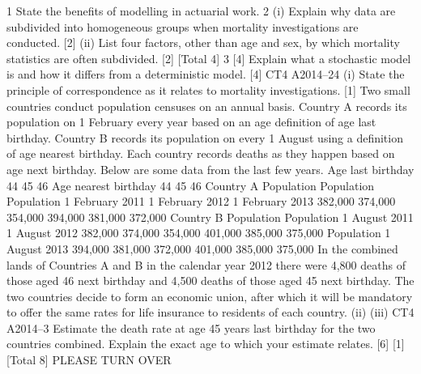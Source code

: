 \documentclass[a4paper,12pt]{article}
\begin{document}
\begin{enumerate}
1 State the benefits of modelling in actuarial work.
2 (i) Explain why data are subdivided into homogeneous groups when mortality
investigations are conducted.
[2]
(ii) List four factors, other than age and sex, by which mortality statistics are often
subdivided.
[2]
[Total 4]
3
[4]
Explain what a stochastic model is and how it differs from a deterministic model. [4]
CT4 A2014–24
(i)
State the principle of correspondence as it relates to mortality investigations.
[1]
Two small countries conduct population censuses on an annual basis. Country A
records its population on 1 February every year based on an age definition of age last
birthday. Country B records its population on every 1 August using a definition of
age nearest birthday. Each country records deaths as they happen based on age
next birthday.
Below are some data from the last few years.
Age last
birthday
44
45
46
Age nearest
birthday
44
45
46
Country A
Population
Population
Population
1 February 2011 1 February 2012 1 February 2013
382,000
374,000
354,000
394,000
381,000
372,000
Country B
Population
Population
1 August 2011
1 August 2012
382,000
374,000
354,000
401,000
385,000
375,000
Population
1 August 2013
394,000
381,000
372,000
401,000
385,000
375,000
In the combined lands of Countries A and B in the calendar year 2012 there were
4,800 deaths of those aged 46 next birthday and 4,500 deaths of those aged 45 next
birthday.
The two countries decide to form an economic union, after which it will be mandatory
to offer the same rates for life insurance to residents of each country.
(ii)
(iii)
CT4 A2014–3
Estimate the death rate at age 45 years last birthday for the two countries
combined.
Explain the exact age to which your estimate relates.
[6]
[1]
[Total 8]
PLEASE TURN OVER
\newpage


\end{enumerate}
\end{document}
